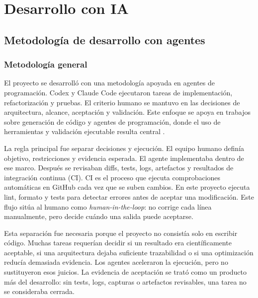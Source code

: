 \chapter{Desarrollo con IA}

\section{Metodología de desarrollo con agentes}

\subsection{Metodología general}

El proyecto se desarrolló con una metodología apoyada en agentes de
programación. Codex y Claude Code ejecutaron tareas de implementación,
refactorización y pruebas. El criterio humano se mantuvo en las decisiones de
arquitectura, alcance, aceptación y validación.
Este enfoque se apoya en trabajos sobre generación de código y agentes de
programación, donde el uso de herramientas y validación ejecutable resulta
central \cite{chen2021codex,austin2021programsynthesis,yang2024sweagent}.

La regla principal fue separar decisiones y ejecución. El equipo humano definía
objetivo, restricciones y evidencia esperada. El agente implementaba dentro de
ese marco. Después se revisaban diffs, tests, logs, artefactos y resultados de
integración continua (CI). CI es el proceso que ejecuta comprobaciones
automáticas en GitHub cada vez que se suben cambios. En este proyecto ejecuta
lint, formato y tests para detectar errores antes de aceptar una modificación.
Este flujo sitúa al humano como \textit{human-in-the-loop}: no corrige cada
línea manualmente, pero decide cuándo una salida puede aceptarse.

Esta separación fue necesaria porque el proyecto no consistía solo en escribir
código. Muchas tareas requerían decidir si un resultado era científicamente
aceptable, si una arquitectura dejaba suficiente trazabilidad o si una
optimización reducía demasiada evidencia. Los agentes aceleraron la ejecución,
pero no sustituyeron esos juicios. La evidencia de aceptación se trató como un
producto más del desarrollo: sin tests, logs, capturas o artefactos revisables,
una tarea no se consideraba cerrada.

